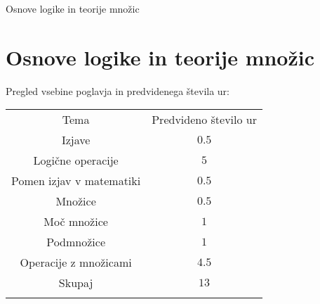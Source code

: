 \begin{priprava}{0}{}{}{Osnove logike in teorije množic}{}{}
    
    \chapter{Osnove logike in teorije množic}

    \Large{Pregled vsebine poglavja in predvidenega števila ur:}

    \begin{table}[H]
        \centering
        \begin{tabular}{||c|c||} 
        \hhline{|t:==:t|}
        \rowcolor[rgb]{0.843,0.718,0.718} 
        Tema  & Predvideno število ur   \\ 
        \hhline{|:==:|}
        Izjave & $0.5$    \\ 
        \hline
        Logične operacije & $5$    \\ 
        \hline
        Pomen izjav v matematiki & $0.5$    \\ 
        \hline
        Množice & $0.5$     \\
        \hline
        Moč množice & $1$     \\
        \hline
        Podmnožice & $1$    \\ 
        \hline
        Operacije z množicami & $4.5$    \\ 
        \hhline{|:==:|}
        Skupaj & $13$     \\
        \hhline{|b:==:b|}
        \end{tabular}
    \end{table}


    
\end{priprava}